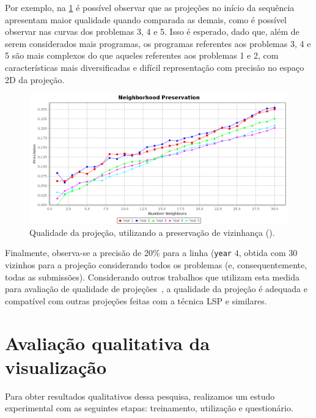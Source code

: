 		Por exemplo, na \cref{fig:neighborhoodAPOO30} é possível observar que as projeções no início da
		sequência apresentam maior qualidade quando comparada as demais, como é possível observar
		nas curvas dos problemas 3, 4 e 5. Isso é esperado, dado que, além de serem considerados
		mais programas, os programas referentes aos problemas 3, 4 e 5 são mais complexos do que
		aqueles referentes aos problemas 1 e 2, com características mais diversificadas e difícil
		representação com precisão no espaço 2D da projeção. 
	
		\begin{figure}
			\centering
			\includegraphics[width=0.85\linewidth]{imagem/neighborhoodAPOO30}
			\caption{Qualidade da projeção, utilizando a preservação de vizinhança ().}
			\label{fig:neighborhoodAPOO30}
		\end{figure}	
	
		Finalmente, observa-se a precisão de 20\% para a linha (\texttt{year} $4$, obtida com 30 vizinhos para a
		projeção considerando todos os problemas (e, consequentemente, todas as submissões). Considerando
		outros trabalhos que utilizam esta medida para avaliação de qualidade de projeções~\cite{phd:paulovich},
		a qualidade da projeção é adequada e compatível com outras projeções feitas com a técnica LSP e
		similares.
		
		

	
	\section{Avaliação qualitativa da visualização}
	\label{sec:avalQualitativa}
	
		Para obter resultados qualitativos dessa pesquisa, realizamos um estudo experimental com
		as seguintes etapas: treinamento, utilização e questionário.
		
